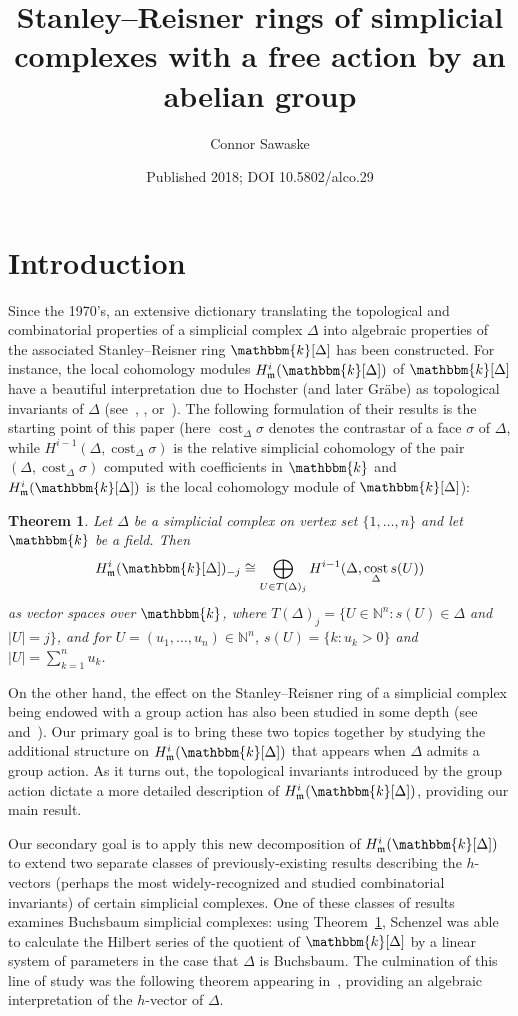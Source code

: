 \documentclass[10pt]{amsart}
\title[Stanley--Reisner rings with a group action]{Stanley--Reisner rings of simplicial complexes with a free action by an abelian group}
\author{Connor Sawaske}
\date{Published 2018; DOI 10.5802/alco.29}
\newtheorem{theo}{Theorem}[section]
\theoremstyle{definition}
\DeclareMathOperator\cost{cost}
\newcommand{\field}{\mathbbm{k}}
\newcommand{\NN}{{\mathbb N}}
\newcommand{\mideal}{\ensuremath{\mathfrak{m}}}
\begin{document}
\maketitle

\section{Introduction}

Since the 1970's, an extensive dictionary translating the topological and combinatorial properties of a simplicial complex $\Delta$ into algebraic properties of the associated Stanley--Reisner ring $\field[\Delta]$ has been constructed. For instance, the local cohomology modules $H_\mideal^i(\field[\Delta])$ of $\field[\Delta]$ have a beautiful interpretation due to Hochster (and later Gr\"abe) as topological invariants of $\Delta$ (see~\cite[Theorem~2]{Grabe}, \cite{Reisner}, or~\cite[Section~II.4]{St-96}). The following formulation of their results is the starting point of this paper (here $\cost_\Delta \sigma$ denotes the contrastar of a face $\sigma$ of $\Delta$, while $H^{i-1}(\Delta, \cost_\Delta \sigma)$ is the relative simplicial cohomology of the pair $(\Delta, \cost_\Delta \sigma)$ computed with coefficients in $\field$ and $H_\mideal^i(\field[\Delta])$ is the local cohomology module of $\field[\Delta]$):

\begin{theo}\label{Reisner}
Let $\Delta$ be a simplicial complex on vertex set $\{1, \ldots, n\}$ and let $\field$ be a field. Then
\[
H_\mideal^i(\field[\Delta])_{-j}\cong \bigoplus_{U\in T(\Delta)_j}H^{i-1}(\Delta, \cost_\Delta s(U))
\]
as vector spaces over $\field$, where $T(\Delta)_j=\{U\in \NN^n: s(U)\in \Delta$ and $|U|=j\}$, and for $U=(u_1, \ldots, u_n)\in\NN^n$, $s(U)=\{k:u_k>0\}$ and $|U|=\sum_{k=1}^nu_k$.
\end{theo}

On the other hand, the effect on the Stanley--Reisner ring of a simplicial complex being endowed with a group action has also been studied in some depth (see~\cite[Section~III.8]{St-96} and~\cite{AdinThesis}). Our primary goal is to bring these two topics together by studying the additional structure on $H_\mideal^i(\field[\Delta])$ that appears when $\Delta$ admits a group action. As it turns out, the topological invariants introduced by the group action dictate a more detailed description of $H_\mideal^i(\field[\Delta])$, providing our main result.

Our secondary goal is to apply this new decomposition of $H_\mideal^i(\field[\Delta])$ to extend two separate classes of previously-existing results describing the $h$-vectors (perhaps the most widely-recognized and studied combinatorial invariants) of certain simplicial complexes. One of these classes of results examines Buchsbaum simplicial complexes: using Theorem~\ref{Reisner}, Schenzel was able to calculate the Hilbert series of the quotient of $\field[\Delta]$ by a linear system of parameters in the case that $\Delta$ is Buchsbaum. The culmination of this line of study was the following theorem appearing in~\cite{Schenzel}, providing an algebraic interpretation of the $h$-vector of $\Delta$.
\end{document}
